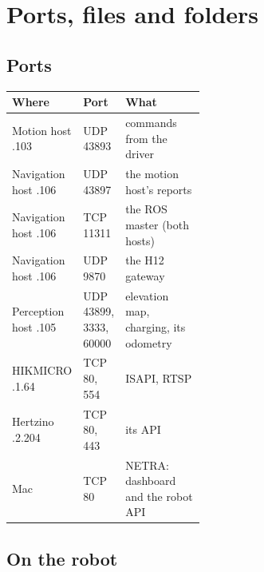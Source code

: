 \chapter{Ports, files and folders}
\label{ch:i-reference}

\section{Ports}

\begin{center}
\begin{tabularx}{\linewidth}{@{}>{\raggedright}p{0.28\linewidth}p{0.2\linewidth}X@{}}
  \toprule
  \textbf{Where} & \textbf{Port} & \textbf{What} \\
  \midrule
  Motion host .103 & UDP 43893 & commands from the driver \\
  Navigation host .106 & UDP 43897 & the motion host's reports \\
  Navigation host .106 & TCP 11311 & the ROS master (both hosts) \\
  Navigation host .106 & UDP 9870 & the H12 gateway \\
  Perception host .105 & UDP 43899, 3333, 60000 & elevation map, charging, its odometry \\
  HIKMICRO .1.64 & TCP 80, 554 & ISAPI, RTSP \\
  Hertzino .2.204 & TCP 80, 443 & its API \\
  Mac & TCP 80 & NETRA: dashboard and the robot API \\
  \bottomrule
\end{tabularx}
\end{center}

\section{On the robot}

